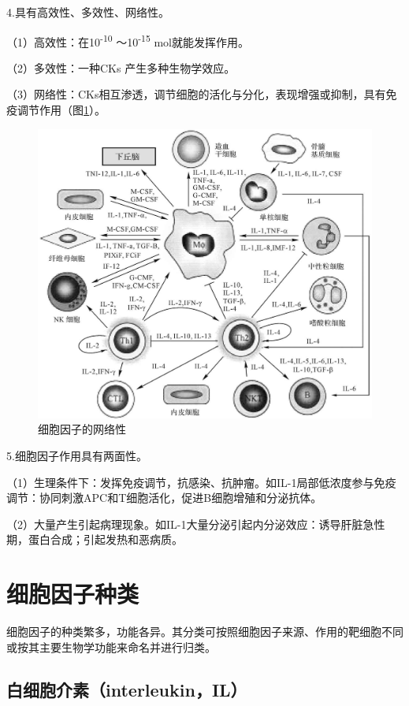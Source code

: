 4.具有高效性、多效性、网络性。

（1）高效性：在10\textsuperscript{-10} ～10\textsuperscript{-15}
mol就能发挥作用。

（2）多效性：一种CKs 产生多种生物学效应。

（3）网络性：CKs相互渗透，调节细胞的活化与分化，表现增强或抑制，具有免疫调节作用（图\ref{fig6-3}）。

\begin{figure}[!htbp]
 \centering
 \includegraphics[width=.6\textwidth]{./images/Image00093.jpg}
 \captionsetup{justification=centering}
 \caption{细胞因子的网络性}
 \label{fig6-3}
  \end{figure} 

5.细胞因子作用具有两面性。

（1）生理条件下：发挥免疫调节，抗感染、抗肿瘤。如IL-1局部低浓度参与免疫调节：协同刺激APC和T细胞活化，促进B细胞增殖和分泌抗体。

（2）大量产生引起病理现象。如IL-1大量分泌引起内分泌效应：诱导肝脏急性期，蛋白合成；引起发热和恶病质。

\section{细胞因子种类}

细胞因子的种类繁多，功能各异。其分类可按照细胞因子来源、作用的靶细胞不同或按其主要生物学功能来命名并进行归类。


\subsection{白细胞介素（interleukin，IL）}

